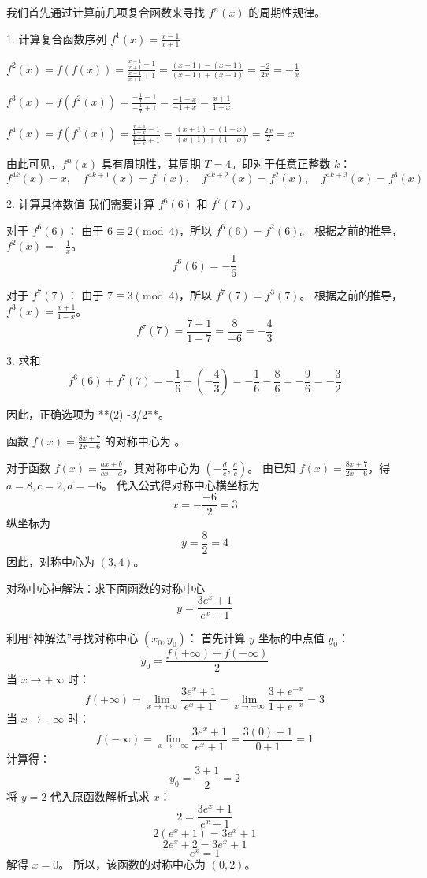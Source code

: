 \begin{questions}
\begin{solution}
我们首先通过计算前几项复合函数来寻找 $f^n(x)$ 的周期性规律。

1. 计算复合函数序列
$f^1(x) = \frac{x-1}{x+1}$

$f^2(x) = f(f(x)) = \frac{\frac{x-1}{x+1}-1}{\frac{x-1}{x+1}+1} = \frac{(x-1)-(x+1)}{(x-1)+(x+1)} = \frac{-2}{2x} = -\frac{1}{x}$

$f^3(x) = f(f^2(x)) = \frac{-\frac{1}{x}-1}{-\frac{1}{x}+1} = \frac{-1-x}{-1+x} = \frac{x+1}{1-x}$

$f^4(x) = f(f^3(x)) = \frac{\frac{x+1}{1-x}-1}{\frac{x+1}{1-x}+1} = \frac{(x+1)-(1-x)}{(x+1)+(1-x)} = \frac{2x}{2} = x$

由此可见，$f^n(x)$ 具有周期性，其周期 $T = 4$。即对于任意正整数 $k$：
\[ f^{4k}(x) = x, \quad f^{4k+1}(x) = f^1(x), \quad f^{4k+2}(x) = f^2(x), \quad f^{4k+3}(x) = f^3(x) \]

2. 计算具体数值
我们需要计算 $f^6(6)$ 和 $f^7(7)$。

对于 $f^6(6)$：
由于 $6 \equiv 2 \pmod 4$，所以 $f^6(6) = f^2(6)$。
根据之前的推导，$f^2(x) = -\frac{1}{x}$。
\[ f^6(6) = -\frac{1}{6} \]

对于 $f^7(7)$：
由于 $7 \equiv 3 \pmod 4$，所以 $f^7(7) = f^3(7)$。
根据之前的推导，$f^3(x) = \frac{x+1}{1-x}$。
\[ f^7(7) = \frac{7+1}{1-7} = \frac{8}{-6} = -\frac{4}{3} \]

3. 求和
\[ f^6(6) + f^7(7) = -\frac{1}{6} + \left( -\frac{4}{3} \right) = -\frac{1}{6} - \frac{8}{6} = -\frac{9}{6} = -\frac{3}{2} \]

因此，正确选项为 **(2) -3/2**。
\end{solution}

\question 函数 $f(x) = \frac{8x+7}{2x-6}$ 的对称中心为 \underline{\phantom{ans}}。

\begin{solution}
对于函数 $f(x) = \frac{ax+b}{cx+d}$，其对称中心为 $\left( -\frac{d}{c}, \frac{a}{c} \right)$。
由已知 $f(x) = \frac{8x+7}{2x-6}$，得 $a=8, c=2, d=-6$。
代入公式得对称中心横坐标为
\[
x = -\frac{-6}{2} = 3
\]
纵坐标为
\[
y = \frac{8}{2} = 4
\]
因此，对称中心为 $(3,4)$。
\end{solution}

\question
对称中心神解法：求下面函数的对称中心
\[
y = \frac{3e^x + 1}{e^x + 1}
\]

\begin{solution}
利用“神解法”寻找对称中心 $(x_0, y_0)$：
首先计算 $y$ 坐标的中点值 $y_0$：
\[
y_0 = \frac{f(+\infty) + f(-\infty)}{2}
\]
当 $x \to +\infty$ 时：
\[
f(+\infty) = \lim_{x \to +\infty} \frac{3e^x + 1}{e^x + 1} = \lim_{x \to +\infty} \frac{3 + e^{-x}}{1 + e^{-x}} = 3
\]
当 $x \to -\infty$ 时：
\[
f(-\infty) = \lim_{x \to -\infty} \frac{3e^x + 1}{e^x + 1} = \frac{3(0) + 1}{0 + 1} = 1
\]
计算得：
\[
y_0 = \frac{3 + 1}{2} = 2
\]
将 $y = 2$ 代入原函数解析式求 $x$：
\[
2 = \frac{3e^x + 1}{e^x + 1}
\]
\[
2(e^x + 1) = 3e^x + 1
\]
\[
2e^x + 2 = 3e^x + 1
\]
\[
e^x = 1
\]
解得 $x = 0$。
所以，该函数的对称中心为 $(0, 2)$。
\end{solution}


\end{questions}
